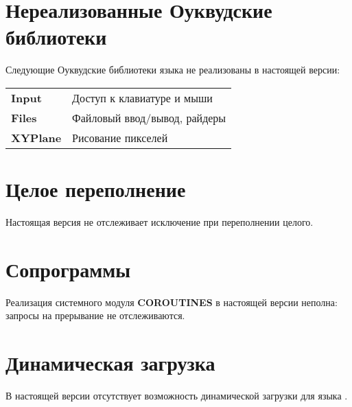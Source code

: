\section*{Нереализованные Оуквудские библиотеки}

Следующие Оуквудские библиотеки языка
\ot{} не реализованы в настоящей версии:
\begin{flushleft}
\begin{tabular}{lp{7cm}}
\bf Input   & Доступ к клавиатуре и мыши \\
\bf Files   & Файловый ввод/вывод, райдеры         \\
\bf XYPlane & Рисование пикселей          \\
\end{tabular}
\end{flushleft}

\ifgenc
\section*{Целое переполнение}

Настоящая версия не отслеживает исключение при переполнении целого.
\fi

\section*{Сопрограммы}

Реализация системного модуля {\bf COROUTINES} в настоящей версии неполна: 
запросы на прерывание не отслеживаются.

\section*{Динамическая загрузка}

В настоящей версии отсутствует возможность динамической загрузки для 
языка \ot{}.
